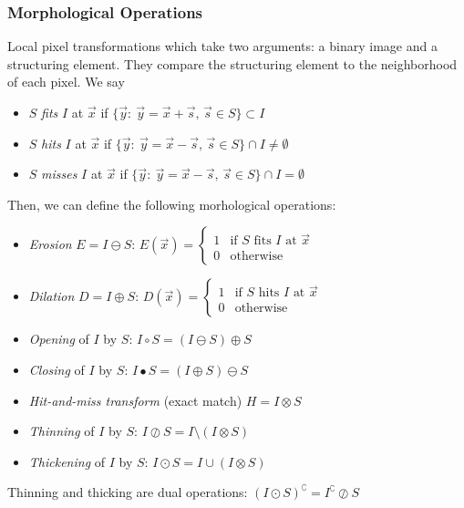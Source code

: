\documentclass[a4paper,10pt]{article}
\begin{document}
\subsubsection{Morphological Operations}
Local pixel transformations which take two arguments: a binary image and a structuring element. They compare the structuring element to the neighborhood of each pixel. We say
\begin{itemize}
    \item \(S\) \emph{fits} \(I\) at \(\vec{x}\) if \(\{\vec{y}:\: \vec{y} = \vec{x} + \vec{s},\, \vec{s} \in S\} \subset I\)
    \item \(S\) \emph{hits} \(I\) at \(\vec{x}\) if \(\{\vec{y}:\: \vec{y} = \vec{x} - \vec{s},\, \vec{s} \in S\} \cap I \neq \emptyset\)
    \item \(S\) \emph{misses} \(I\) at \(\vec{x}\) if \(\{\vec{y}:\: \vec{y} = \vec{x} - \vec{s},\, \vec{s} \in S\} \cap I = \emptyset\)
\end{itemize}
Then, we can define the following morhological operations:
\begin{itemize}
    \item \emph{Erosion} \(E = I \ominus S\): \(E(\vec{x}) = \begin{cases}
        1 & \text{if } S \text{ fits } I \text{ at } \vec{x}\\
        0 & \text{otherwise}
    \end{cases}\)
    \item \emph{Dilation} \(D = I \oplus S\): \(D(\vec{x}) = \begin{cases}
        1 & \text{if } S \text{ hits } I \text{ at } \vec{x}\\
        0 & \text{otherwise}
    \end{cases}\)
    \item \emph{Opening} of \(I\) by \(S\): \(I \circ S = (I \ominus S) \oplus S\)
    \item \emph{Closing} of \(I\) by \(S\): \(I \bullet S = (I \oplus S) \ominus S\) 
    \item \emph{Hit-and-miss transform} (exact match) \(H = I \otimes S\)
    \item \emph{Thinning} of \(I\) by \(S\): \(I \oslash S = I \setminus (I \otimes S)\)
    \item \emph{Thickening} of \(I\) by \(S\): \(I \odot S = I \cup (I \otimes S)\)
\end{itemize}
Thinning and thicking are dual operations: \((I \odot S)^\complement = I^\complement \oslash S\)
\end{document}
